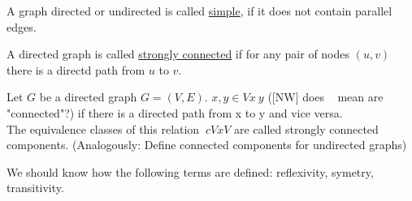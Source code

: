 \begin{definition}
    A graph directed or undirected is called \underline{simple}, if it does not contain parallel edges.
\end{definition}

\begin{definition}
        A directed graph is called \underline{strongly connected} if for any pair of nodes $(u,v)$ 
        there is a directd path from $u$ to $v$.
\end{definition}

Let $G$ be a directed graph $G = (V,E)$. $x,y \in V x~y$ ([NW] does ~ mean are "connected"?)
if there is a directed path from x to y and vice versa. \\

The equivalence classes of this relation $~c VxV$ are called strongly connected components.
(Analogously: Define connected components for undirected graphs)

\begin{information}
    We should know how the following terms are defined: reflexivity, symetry, transitivity.
\end{information}


